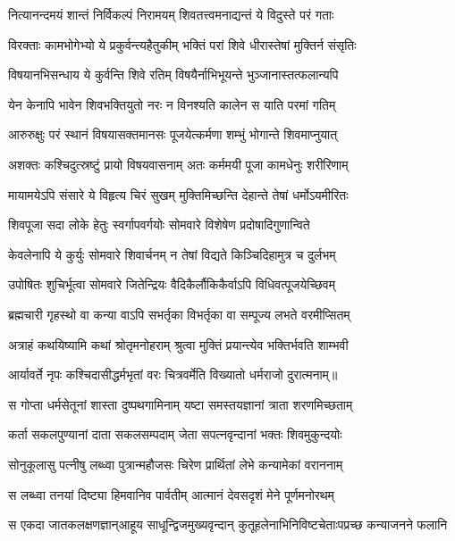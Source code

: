 
\twolineshloka
{नित्यानन्दमयं शान्तं निर्विकल्पं निरामयम्}
{शिवतत्त्वमनाद्यन्तं ये विदुस्ते परं गताः} %

\twolineshloka
{विरक्ताः कामभोगेभ्यो ये प्रकुर्वन्त्यहैतुकीम्}
{भक्तिं परां शिवे धीरास्तेषां मुक्तिर्न संसृतिः} %

\twolineshloka
{विषयानभिसन्धाय ये कुर्वन्ति शिवे रतिम्}
{विषयैर्नाभिभूयन्ते भुञ्जानास्तत्फलान्यपि} %

\twolineshloka
{येन केनापि भावेन शिवभक्तियुतो नरः}
{न विनश्यति कालेन स याति परमां गतिम्} %

\twolineshloka
{आरुरुक्षुः परं स्थानं विषयासक्तमानसः}
{पूजयेत्कर्मणा शम्भुं भोगान्ते शिवमाप्नुयात्} %

\twolineshloka
{अशक्तः कश्चिदुत्स्रष्टुं प्रायो विषयवासनाम्}
{अतः कर्ममयी पूजा कामधेनुः शरीरिणाम्} %

\twolineshloka
{मायामयेऽपि संसारे ये विहृत्य चिरं सुखम्}
{मुक्तिमिच्छन्ति देहान्ते तेषां धर्मोऽयमीरितः} %

\twolineshloka
{शिवपूजा सदा लोके हेतुः स्वर्गापवर्गयोः}
{सोमवारे विशेषेण प्रदोषादिगुणान्विते} %

\twolineshloka
{केवलेनापि ये कुर्युः सोमवारे शिवार्चनम्}
{न तेषां विद्यते किञ्चिदिहामुत्र च दुर्लभम्} %

\twolineshloka
{उपोषितः शुचिर्भूत्वा सोमवारे जितेन्द्रियः}
{वैदिकैर्लौकिकैर्वाऽपि विधिवत्पूजयेच्छिवम्} %

\twolineshloka
{ब्रह्मचारी गृहस्थो वा कन्या वाऽपि सभर्तृका}
{विभर्तृका वा सम्पूज्य लभते वरमीप्सितम्} %

\twolineshloka
{अत्राहं कथयिष्यामि कथां श्रोतृमनोहराम्}
{श्रुत्वा मुक्तिं प्रयान्त्येव भक्तिर्भवति शाम्भवी} %

\twolineshloka
{आर्यावर्ते नृपः कश्चिदासीद्धर्मभृतां वरः}
{चित्रवर्मेति विख्यातो धर्मराजो दुरात्मनाम्॥} %

\twolineshloka
{स गोप्ता धर्मसेतूनां शास्ता दुष्पथगामिनाम्}
{यष्टा समस्तयज्ञानां त्राता शरणमिच्छताम्} %

\twolineshloka
{कर्ता सकलपुण्यानां दाता सकलसम्पदाम्}
{जेता सपत्नवृन्दानां भक्तः शिवमुकुन्दयोः} %

\twolineshloka
{सोनुकूलासु पत्नीषु लब्ध्वा पुत्रान्महौजसः}
{चिरेण प्रार्थितां लेभे कन्यामेकां वराननाम्} %

\twolineshloka
{स लब्ध्वा तनयां दिष्ट्या हिमवानिव पार्वतीम्}
{आत्मानं देवसदृशं मेने पूर्णमनोरथम्} %

\fourlineindentedshloka
{स एकदा जातकलक्षणज्ञान्}{आहूय साधून्द्विजमुख्यवृन्दान्}
{कुतूहलेनाभिनिविष्टचेताः}{पप्रच्छ कन्याजनने फलानि} %

